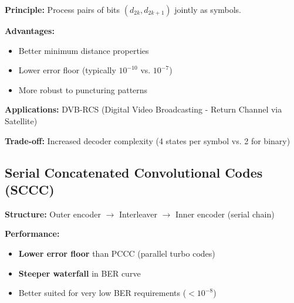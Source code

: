 \textbf{Principle:} Process pairs of bits $(d_{2k}, d_{2k+1})$ jointly as symbols.

\textbf{Advantages:}
\begin{itemize}
\item Better minimum distance properties
\item Lower error floor (typically $10^{-10}$ vs. $10^{-7}$)
\item More robust to puncturing patterns
\end{itemize}

\textbf{Applications:} DVB-RCS (Digital Video Broadcasting - Return Channel via Satellite)

\textbf{Trade-off:} Increased decoder complexity (4 states per symbol vs. 2 for binary)

\subsection{Serial Concatenated Convolutional Codes (SCCC)}

\textbf{Structure:} Outer encoder $\rightarrow$ Interleaver $\rightarrow$ Inner encoder (serial chain)

\begin{center}
\end{center}

\textbf{Performance:}
\begin{itemize}
\item \textbf{Lower error floor} than PCCC (parallel turbo codes)
\item \textbf{Steeper waterfall} in BER curve
\item Better suited for very low BER requirements ($< 10^{-8}$)
\end{itemize}

